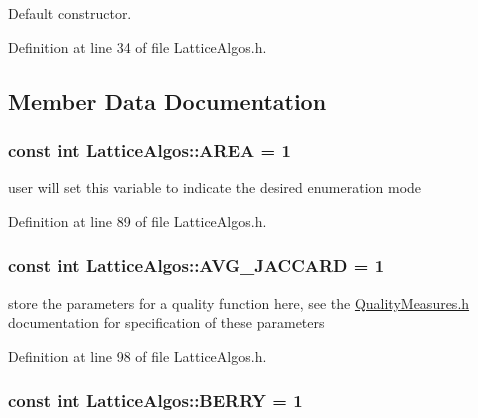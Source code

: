 Default constructor. 



Definition at line 34 of file LatticeAlgos.h.



\subsection{Member Data Documentation}
\hypertarget{class_lattice_algos_a0a79ddaab00906dea5756ac05a4861a5}{
\subsubsection[{AREA}]{\setlength{\rightskip}{0pt plus 5cm}const int {\bf LatticeAlgos::AREA} = 1}}
\label{class_lattice_algos_a0a79ddaab00906dea5756ac05a4861a5}


user will set this variable to indicate the desired enumeration mode 



Definition at line 89 of file LatticeAlgos.h.

\hypertarget{class_lattice_algos_a24156b300d4b23d0d618f548091d0aeb}{
\subsubsection[{AVG\_\-JACCARD}]{\setlength{\rightskip}{0pt plus 5cm}const int {\bf LatticeAlgos::AVG\_\-JACCARD} = 1}}
\label{class_lattice_algos_a24156b300d4b23d0d618f548091d0aeb}


store the parameters for a quality function here, see the \hyperlink{_quality_measures_8h}{QualityMeasures.h} documentation for specification of these parameters 



Definition at line 98 of file LatticeAlgos.h.

\hypertarget{class_lattice_algos_a4614af1d4a830831f77ea099cad5e0a3}{
\subsubsection[{BERRY}]{\setlength{\rightskip}{0pt plus 5cm}const int {\bf LatticeAlgos::BERRY} = 1}}
\label{class_lattice_algos_a4614af1d4a830831f77ea099cad5e0a3}


